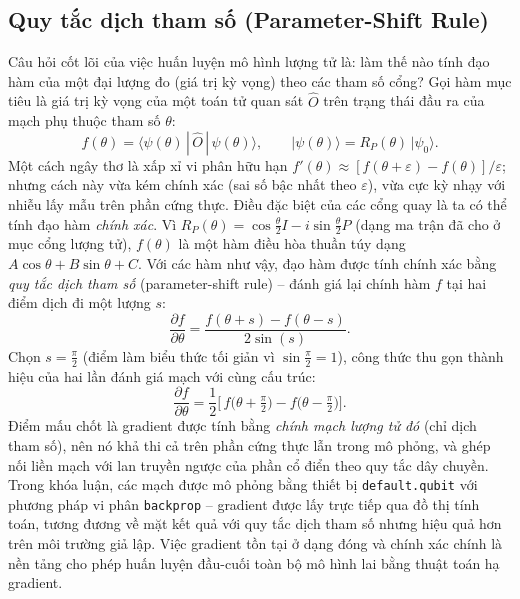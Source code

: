 \subsection{Quy tắc dịch tham số (Parameter-Shift Rule)}
\label{subsec:pshift}
Câu hỏi cốt lõi của việc huấn luyện mô hình lượng tử là: làm thế nào tính đạo hàm của một đại lượng đo (giá trị kỳ vọng) theo các tham số cổng? Gọi hàm mục tiêu là giá trị kỳ vọng của một toán tử quan sát $\hat{O}$ trên trạng thái đầu ra của mạch phụ thuộc tham số $\theta$:
\begin{equation}
    f(\theta) = \langle \psi(\theta)\,|\,\hat{O}\,|\,\psi(\theta)\rangle,
    \qquad |\psi(\theta)\rangle = R_P(\theta)\,|\psi_0\rangle .
\end{equation}
Một cách ngây thơ là xấp xỉ vi phân hữu hạn $f'(\theta)\approx [f(\theta+\varepsilon)-f(\theta)]/\varepsilon$; nhưng cách này vừa kém chính xác (sai số bậc nhất theo $\varepsilon$), vừa cực kỳ nhạy với nhiễu lấy mẫu trên phần cứng thực. Điều đặc biệt của các cổng quay là ta có thể tính đạo hàm \emph{chính xác}. Vì $R_P(\theta)=\cos\tfrac{\theta}{2}I - i\sin\tfrac{\theta}{2}P$ (dạng ma trận đã cho ở mục cổng lượng tử), $f(\theta)$ là một hàm điều hòa thuần túy dạng $A\cos\theta + B\sin\theta + C$. Với các hàm như vậy, đạo hàm được tính chính xác bằng \emph{quy tắc dịch tham số} (parameter-shift rule) -- đánh giá lại chính hàm $f$ tại hai điểm dịch đi một lượng $s$:
\begin{equation}
    \frac{\partial f}{\partial \theta} = \frac{f(\theta + s) - f(\theta - s)}{2\sin(s)} .
\end{equation}
Chọn $s=\tfrac{\pi}{2}$ (điểm làm biểu thức tối giản vì $\sin\tfrac{\pi}{2}=1$), công thức thu gọn thành hiệu của hai lần đánh giá mạch với cùng cấu trúc:
\begin{equation}
    \frac{\partial f}{\partial \theta} = \frac{1}{2}\Big[\, f\!\Big(\theta + \tfrac{\pi}{2}\Big) - f\!\Big(\theta - \tfrac{\pi}{2}\Big) \Big] .
\end{equation}
Điểm mấu chốt là gradient được tính bằng \emph{chính mạch lượng tử đó} (chỉ dịch tham số), nên nó khả thi cả trên phần cứng thực lẫn trong mô phỏng, và ghép nối liền mạch với lan truyền ngược của phần cổ điển theo quy tắc dây chuyền. Trong khóa luận, các mạch được mô phỏng bằng thiết bị \texttt{default.qubit} với phương pháp vi phân \texttt{backprop} -- gradient được lấy trực tiếp qua đồ thị tính toán, tương đương về mặt kết quả với quy tắc dịch tham số nhưng hiệu quả hơn trên môi trường giả lập. Việc gradient tồn tại ở dạng đóng và chính xác chính là nền tảng cho phép huấn luyện đầu-cuối toàn bộ mô hình lai bằng thuật toán hạ gradient.

